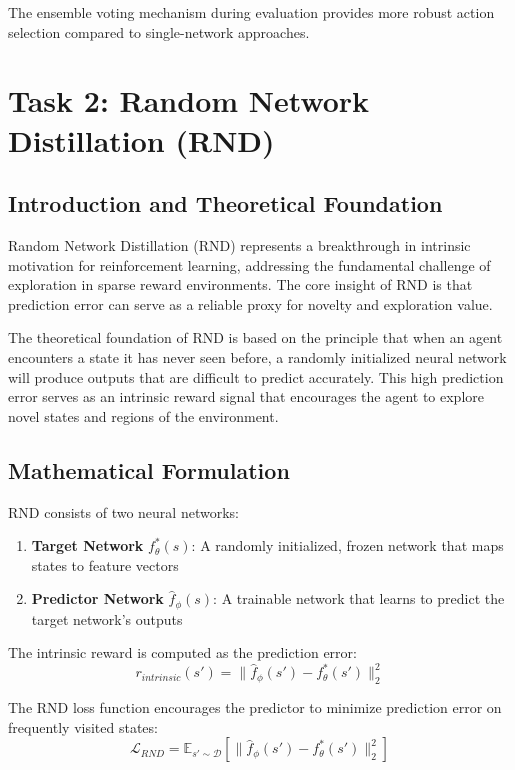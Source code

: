 \documentclass[12pt]{article}
\begin{document}
{{{The ensemble voting mechanism during evaluation provides more robust action selection compared to single-network approaches.

\section{Task 2: Random Network Distillation (RND)}

\subsection{Introduction and Theoretical Foundation}

Random Network Distillation (RND) \cite{burda2018exploration} represents a breakthrough in intrinsic motivation for reinforcement learning, addressing the fundamental challenge of exploration in sparse reward environments. The core insight of RND is that prediction error can serve as a reliable proxy for novelty and exploration value.

The theoretical foundation of RND is based on the principle that when an agent encounters a state it has never seen before, a randomly initialized neural network will produce outputs that are difficult to predict accurately. This high prediction error serves as an intrinsic reward signal that encourages the agent to explore novel states and regions of the environment.

\subsection{Mathematical Formulation}

RND consists of two neural networks:
\begin{enumerate}
    \item \textbf{Target Network} $f^*_\theta(s)$: A randomly initialized, frozen network that maps states to feature vectors
    \item \textbf{Predictor Network} $\hat{f}_\phi(s)$: A trainable network that learns to predict the target network's outputs
\end{enumerate}

The intrinsic reward is computed as the prediction error:
\begin{equation}
r_{intrinsic}(s') = \|\hat{f}_\phi(s') - f^*_\theta(s')\|_2^2
\end{equation}

The RND loss function encourages the predictor to minimize prediction error on frequently visited states:
\begin{equation}
\mathcal{L}_{RND} = \mathbb{E}_{s' \sim \mathcal{D}} \left[ \|\hat{f}_\phi(s') - f^*_\theta(s')\|_2^2 \right]
\end{equation}

}}}
\end{document}

